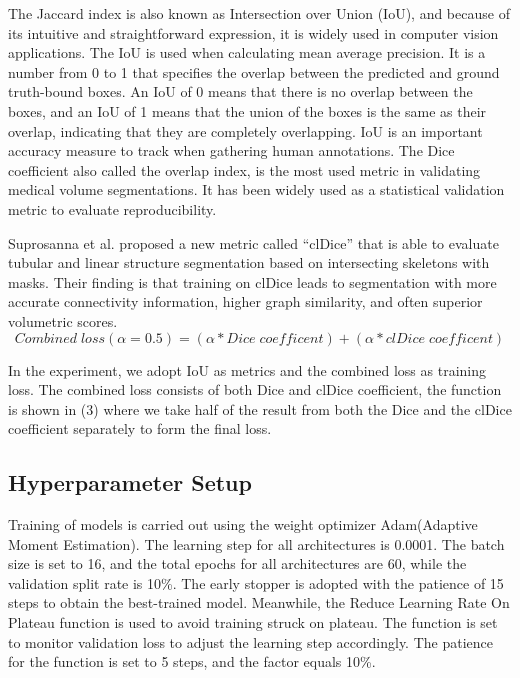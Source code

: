 \documentclass{article}
\begin{document}
The Jaccard index is also known as Intersection over Union (IoU), and because of its intuitive and straightforward expression, it is widely used in computer vision applications. The IoU is used when calculating mean average precision. It is a number from 0 to 1 that specifies the overlap between the predicted and ground truth-bound boxes. An IoU of 0 means that there is no overlap between the boxes, and an IoU of 1 means that the union of the boxes is the same as their overlap, indicating that they are completely overlapping. IoU is an important accuracy measure to track when gathering human annotations. The Dice coefficient also called the overlap index, is the most used metric in validating medical volume segmentations. It has been widely used as a statistical validation metric to evaluate reproducibility.

Suprosanna et al.\cite{shit2020cldice} proposed a new metric called “clDice” that is able to evaluate tubular and linear structure segmentation based on intersecting skeletons with masks. Their finding is that training on clDice leads to segmentation with more accurate connectivity information, higher graph similarity, and often superior volumetric scores.
\begin{equation}
    Combined\;loss(\alpha=0.5) = (\alpha * Dice\;coefficent)+(\alpha * clDice\;coefficent)
\end{equation}

In the experiment, we adopt IoU as metrics and the combined loss as training loss. The combined loss consists of both Dice and clDice coefficient, the function is shown in (3) where we take half of the result from both the Dice and the clDice coefficient separately to form the final loss.

\subsection{Hyperparameter Setup}
Training of models is carried out using the weight optimizer Adam(Adaptive Moment Estimation). The learning step for all architectures is 0.0001. The batch size is set to 16, and the total epochs for all architectures are 60, while the validation split rate is 10\%. The early stopper is adopted with the patience of 15 steps to obtain the best-trained model. Meanwhile, the Reduce Learning Rate On Plateau function is used to avoid training struck on plateau. The function is set to monitor validation loss to adjust the learning step accordingly. The patience for the function is set to 5 steps, and the factor equals 10\%.
\end{document}
